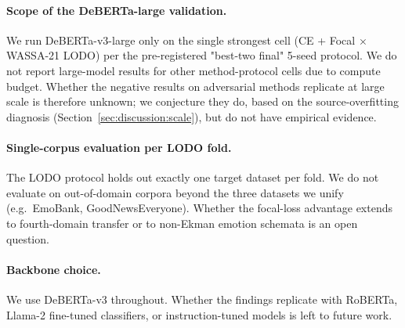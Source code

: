 \paragraph{Scope of the DeBERTa-large validation.}
We run DeBERTa-v3-large only on the single strongest cell (CE + Focal
$\times$ WASSA-21 LODO) per the pre-registered "best-two final"
5-seed protocol. We do not report large-model results for other
method-protocol cells due to compute budget. Whether the negative
results on adversarial methods replicate at large scale is therefore
unknown; we conjecture they do, based on the source-overfitting
diagnosis (Section~\ref{sec:discussion:scale}), but do not have
empirical evidence.

\paragraph{Single-corpus evaluation per LODO fold.}
The LODO protocol holds out exactly one target dataset per fold. We do
not evaluate on out-of-domain corpora beyond the three datasets we
unify (e.g.\ EmoBank, GoodNewsEveryone). Whether the focal-loss
advantage extends to fourth-domain transfer or to non-Ekman emotion
schemata is an open question.

\paragraph{Backbone choice.}
We use DeBERTa-v3 throughout. Whether the findings replicate with
RoBERTa, Llama-2 fine-tuned classifiers, or instruction-tuned models is
left to future work.
